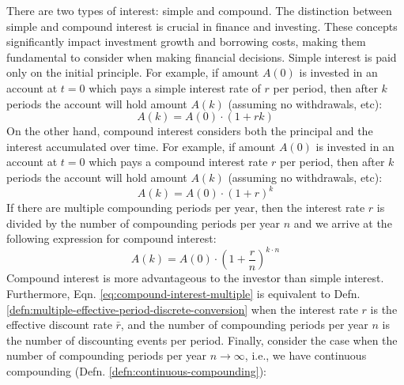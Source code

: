 \documentclass[11pt]{article}
\theoremstyle{definition}
\begin{document}
There are two types of interest: simple and compound. The distinction between simple and compound interest is crucial in finance and investing.
These concepts significantly impact investment growth and borrowing costs, making them fundamental to consider when making financial decisions. 
Simple interest is paid only on the initial principle. 
For example, if amount $A(0)$ is invested in an account at $t=0$ which pays a simple interest rate of $r$ per period, 
then after $k$ periods the account will hold amount $A(k)$ (assuming no withdrawals, etc):
\begin{equation}\label{eq:simple-interest}
A(k) = A(0)\cdot\left(1+rk\right)
\end{equation}
On the other hand, compound interest considers both the principal and the interest accumulated over time. 
For example, if amount $A(0)$ is invested in an account at $t=0$ which pays a compound interest rate $r$ per period, 
then after $k$ periods the account will hold amount $A(k)$ (assuming no withdrawals, etc):
\begin{equation}\label{eq:compound-interest}
A(k) = A(0)\cdot\left(1+r\right)^k
\end{equation}
If there are multiple compounding periods per year, then the interest rate $r$ is divided by the number of compounding periods per year $n$
and we arrive at the following expression for compound interest:
\begin{equation}\label{eq:compound-interest-multiple}
A(k) = A(0)\cdot\left(1+\frac{r}{n}\right)^{k\cdot{n}}
\end{equation}
Compound interest is more advantageous to the investor than simple interest. 
Furthermore, Eqn. \eqref{eq:compound-interest-multiple} is equivalent to Defn. \ref{defn:multiple-effective-period-discrete-conversion}
when the interest rate $r$ is the effective discount rate $\bar{r}$, and the number of compounding periods per year $n$ is the number of discounting events per period.
Finally, consider the case when the number of compounding periods per year $n\rightarrow\infty$, i.e., we have continuous compounding (Defn. \ref{defn:continuous-compounding}):
\end{document}
